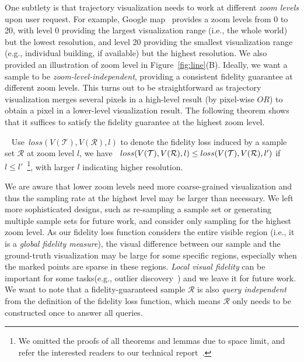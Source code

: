 One subtlety is that trajectory visualization needs to work at different \textit{zoom levels} upon user request. For example, Google map~\cite{googlemap} provides a zoom levels from 0 to 20, with level 0 providing the largest visualization range (i.e., the whole world) but the lowest resolution, and level 20 providing the smallest visualization range (e.g., individual building, if available) but the highest resolution. We also provided an illustration of zoom level in Figure~\ref{fig:line}(B). Ideally, we want a sample to be \textit{zoom-level-independent}, providing a consistent fidelity guarantee at different zoom levels. This turns out to be straightforward as trajectory visualization merges several pixels in a high-level result (by pixel-wise $OR$) to obtain a pixel in a lower-level visualization result. The following theorem shows that it suffices to satisfy the fidelity guarantee at the highest zoom level.
\begin{theorem}~\label{the:level}
	Use~$loss(V(\mathcal{T}), V(\mathcal{R}), l)$ to denote the fidelity loss induced by a sample set $\mathcal{R}$ at zoom level $l$, we have~ $loss(V(\mathcal{T}), V(\mathcal{R}), l) \\ \le loss(V(\mathcal{T}), V(\mathcal{R}), l')$ if $l\le l'$~\footnote{We omitted the proofs of all theorems and lemmas due to space limit, and refer the interested readers to our technical report~\cite{techreport}.}, with larger $l$ indicating higher resolution.
\end{theorem}
We are aware that lower zoom levels need more coarse-grained visualization and thus the sampling rate at the highest level may be larger than necessary. We left more sophisticated designs, such as re-sampling a sample set or generating multiple sample sets for future work, and consider only sampling for the highest zoom level. As our fidelity loss function considers the entire visible region (i.e., it is a \textit{global fidelity measure}), the visual difference between our sample and the ground-truth visualization may be large for some specific regions, especially when the marked points are sparse in these regions. \textit{Local visual fidelity} can be important for some tasks(e.g., outlier discovery~\cite{feng2010matching,mayorga2013splatterplots}) and we leave it for future work. We want to note that a fidelity-guaranteed sample $\mathcal{R}$ is also \textit{query independent} from the definition of the fidelity loss function, which means $\mathcal{R}$ only needs to be constructed once to answer all queries.






